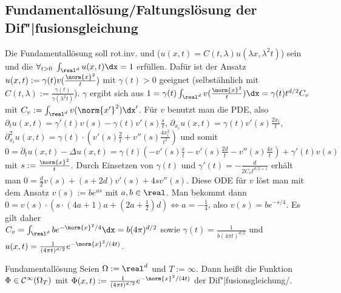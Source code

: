 \subsection{%
    Fundamentallösung/Faltungslösung der Dif"|fusionsgleichung%
}

\begin{Bem}
    Die Fundamentallösung soll rot.inv. und 
    ($u(x, t) = C(t, \lambda) u(\lambda x, \lambda^2 t)$) sein und die
     $\forall_{t > 0}\; \int_{\real^d} u(x, t) \dx = 1$ erfüllen.
    Dafür ist der Ansatz $u(x, t) := \gamma(t) v(\frac{\norm{x}^2}{t})$ mit $\gamma(t) > 0$
    geeignet (selbstähnlich mit $C(t, \lambda) := \frac{\gamma(t)}{\gamma(\lambda^2 t)}$).
    $\gamma$ ergibt sich aus
    $1 = \gamma(t) \int_{\real^d} v(\frac{\norm{x}^2}{t}) \dx = \gamma(t) t^{d/2} C_v$ mit
    $C_v := \int_{\real^d} v(\norm{x'}^2) \dx'$.
    Für $v$ benutzt man die PDE, also
    $\partial_t u(x, t) = \gamma'(t) v(s) - \gamma(t) v'(s) \frac{s}{t}$,
    $\partial_{x_i} u(x, t) = \gamma(t) v'(s) \frac{2x_i}{t}$,
    $\partial_{x_i}^2 u(x, t) = \gamma(t) \cdot (v'(s) \frac{2}{t} + v''(s) \frac{4x_i^2}{t^2})$
    und somit $0 = \partial_t u(x, t) - \Delta u(x, t)
    = \gamma(t) (-v'(s) \frac{s}{t} - v'(s) \frac{2d}{t} - v''(s) \frac{4s}{t}) + \gamma'(t) v(s)$
    mit $s := \frac{\norm{x}^2}{t}$.
    Durch Einsetzen von $\gamma(t)$ und $\gamma'(t) = -\frac{d}{2C_v t^{d/2+1}}$ erhält man
    $0 = \frac{d}{2} v(s) + (s + 2d) v'(s) + 4s v''(s)$.
    Diese ODE für $v$ löst man mit dem Ansatz $v(s) := be^{as}$ mit $a, b \in \real$.
    Man bekommt dann $0 = v(s) \cdot (s \cdot (4a + 1)a + (2a + \frac{1}{2})d)
    \iff a = -\frac{1}{4}$, also $v(s) = be^{-s/4}$.
    Es gilt daher\\
    $C_v = \int_{\real^d} be^{-\norm{x}^2/4} \dx = b (4\pi)^{d/2}$ sowie
    $\gamma(t) = \frac{1}{b(4\pi t)^{d/2}}$ und
    $u(x, t) = \frac{1}{(4\pi t)^{d/2}} e^{-\norm{x}^2/(4t)}$.
\end{Bem}

\linie

\begin{Def}{Fundamentallösung}
    Seien $\Omega := \real^d$ und $T := \infty$.
    Dann heißt die Funktion $\Phi \in \mathcal{C}^\infty(\Omega_T)$ mit
    $\Phi(x, t) := \frac{1}{(4\pi t)^{d/2}} e^{-\norm{x}^2/(4t)}$
     der Dif"|fusionsgleichung/.
\end{Def}

